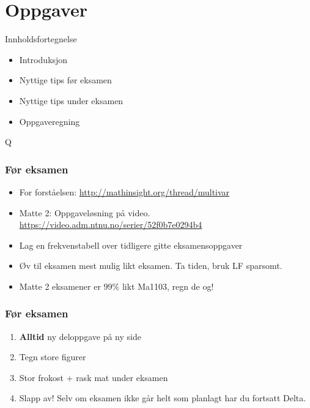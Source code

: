 \begin{frame}
    \titlepage
\end{frame}

\section{Oppgaver}

\begin{frame}{Innholdsfortegnelse}

\begin{itemize}
    \item Introduksjon
    \item Nyttige tips før eksamen
    \item Nyttige tips under eksamen
    \item Oppgaveregning
\end{itemize}Q
    
\end{frame}

\begin{frame}
    \frametitle{Før eksamen}
    \begin{itemize}
        \item For forståelsen: \url{http://mathinsight.org/thread/multivar}
        \item Matte 2: Oppgaveløsning på video. \url{https://video.adm.ntnu.no/serier/52f0b7e0294b4}
        \item Lag en frekvenstabell over tidligere gitte eksamensoppgaver
        \item Øv til eksamen mest mulig likt eksamen. Ta tiden, bruk LF sparsomt. 
        \item Matte 2 eksamener er $99\%$ likt Ma1103, regn de og!
    \end{itemize}
\end{frame}

\begin{frame}
  \frametitle{Før eksamen}
  \begin{enumerate}
    \item \textbf{Alltid} ny deloppgave på ny side
    \item Tegn store figurer 
    \item Stor frokost + rask mat under eksamen
    \item Slapp av! Selv om eksamen ikke går helt som planlagt har du fortsatt Delta. 
  \end{enumerate}
\end{frame}


